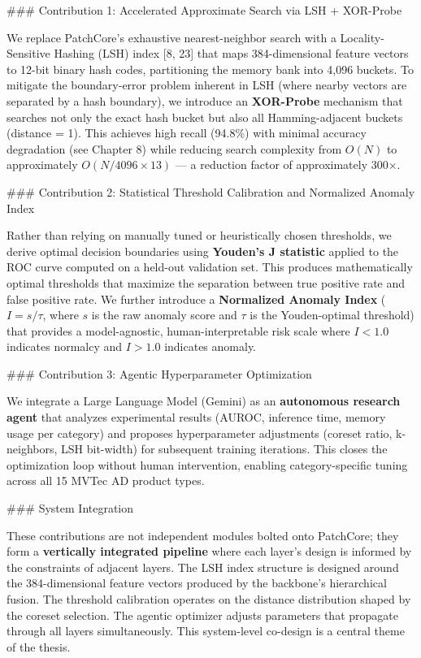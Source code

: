 \documentclass[12pt,a4paper,oneside]{report}
\begin{document}
### Contribution 1: Accelerated Approximate Search via LSH + XOR-Probe

We replace PatchCore's exhaustive nearest-neighbor search with a Locality-Sensitive Hashing (LSH) index [8, 23] that maps 384-dimensional feature vectors to 12-bit binary hash codes, partitioning the memory bank into 4,096 buckets. To mitigate the boundary-error problem inherent in LSH (where nearby vectors are separated by a hash boundary), we introduce an \textbf{XOR-Probe} mechanism that searches not only the exact hash bucket but also all Hamming-adjacent buckets (distance = 1). This achieves high recall (94.8\%) with minimal accuracy degradation (see Chapter 8) while reducing search complexity from $O(N)$ to approximately $O(N/4096 \times 13)$ --- a reduction factor of approximately 300×.

### Contribution 2: Statistical Threshold Calibration and Normalized Anomaly Index

Rather than relying on manually tuned or heuristically chosen thresholds, we derive optimal decision boundaries using \textbf{Youden's J statistic} applied to the ROC curve computed on a held-out validation set. This produces mathematically optimal thresholds that maximize the separation between true positive rate and false positive rate. We further introduce a \textbf{Normalized Anomaly Index} ($I = s / \tau$, where $s$ is the raw anomaly score and $\tau$ is the Youden-optimal threshold) that provides a model-agnostic, human-interpretable risk scale where $I < 1.0$ indicates normalcy and $I > 1.0$ indicates anomaly.

### Contribution 3: Agentic Hyperparameter Optimization

We integrate a Large Language Model (Gemini) as an \textbf{autonomous research agent} that analyzes experimental results (AUROC, inference time, memory usage per category) and proposes hyperparameter adjustments (coreset ratio, k-neighbors, LSH bit-width) for subsequent training iterations. This closes the optimization loop without human intervention, enabling category-specific tuning across all 15 MVTec AD product types.

### System Integration

These contributions are not independent modules bolted onto PatchCore; they form a \textbf{vertically integrated pipeline} where each layer's design is informed by the constraints of adjacent layers. The LSH index structure is designed around the 384-dimensional feature vectors produced by the backbone's hierarchical fusion. The threshold calibration operates on the distance distribution shaped by the coreset selection. The agentic optimizer adjusts parameters that propagate through all layers simultaneously. This system-level co-design is a central theme of the thesis.
\end{document}
